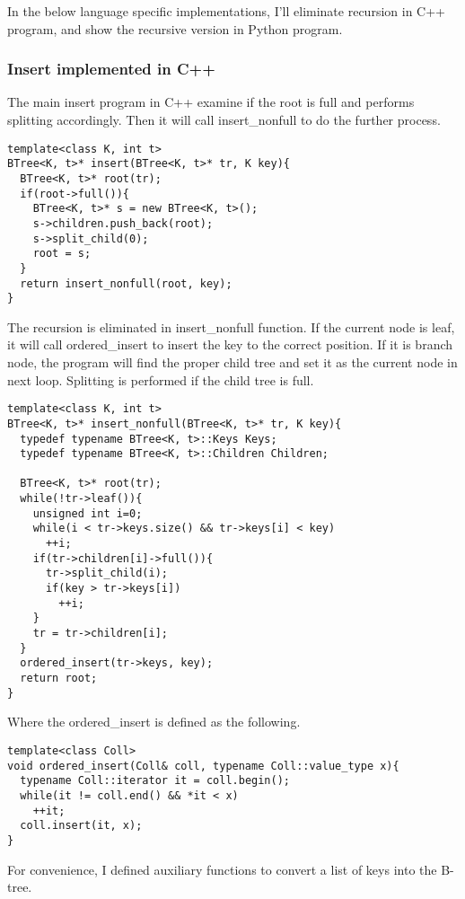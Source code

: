 \documentclass{article}
\begin{document}
In the below language specific implementations, I'll eliminate recursion in
C++ program, and show the recursive version in Python program.

\subsubsection*{Insert implemented in C++}
The main insert program in C++ examine if the root is full and performs splitting
accordingly. Then it will call insert\_nonfull to do the further process.

\lstset{language=C++}
\begin{lstlisting}
template<class K, int t>
BTree<K, t>* insert(BTree<K, t>* tr, K key){
  BTree<K, t>* root(tr);
  if(root->full()){
    BTree<K, t>* s = new BTree<K, t>();
    s->children.push_back(root);
    s->split_child(0);
    root = s;
  }
  return insert_nonfull(root, key);
}
\end{lstlisting}

The recursion is eliminated in insert\_nonfull function. If the current
node is leaf, it will call ordered\_insert to insert the key to the correct
position. If it is branch node, the program will find the proper child
tree and set it as the current node in next loop. Splitting is performed
if the child tree is full.

\begin{lstlisting}
template<class K, int t>
BTree<K, t>* insert_nonfull(BTree<K, t>* tr, K key){
  typedef typename BTree<K, t>::Keys Keys;
  typedef typename BTree<K, t>::Children Children;

  BTree<K, t>* root(tr);
  while(!tr->leaf()){
    unsigned int i=0;
    while(i < tr->keys.size() && tr->keys[i] < key)
      ++i;
    if(tr->children[i]->full()){
      tr->split_child(i);
      if(key > tr->keys[i])
        ++i;
    }
    tr = tr->children[i];
  }
  ordered_insert(tr->keys, key);
  return root;
}
\end{lstlisting}

Where the ordered\_insert is defined as the following.

\begin{lstlisting}
template<class Coll>
void ordered_insert(Coll& coll, typename Coll::value_type x){
  typename Coll::iterator it = coll.begin();
  while(it != coll.end() && *it < x)
    ++it;
  coll.insert(it, x);
}
\end{lstlisting}

For convenience, I defined auxiliary functions to convert a
list of keys into the B-tree.
\end{document}
